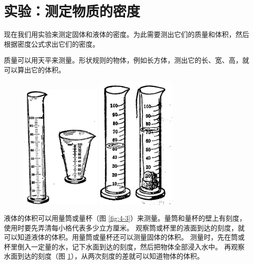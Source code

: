 \section{实验：测定物质的密度}\label{sec:4-2}

现在我们用实验来测定固体和液体的密度。为此需要测出它们的质量和体积，然后根据密度公式求出它们的密度。

质量可以用天平来测量。形状规则的物体，例如长方体，测出它的长、宽、高，就可以算出它的体积。


\begin{figure}[htbp]
    \centering
    \begin{minipage}{7cm}
    \centering
    \includegraphics[width=4cm]{../pic/czwl1-ch4-3}
    \caption{}\label{fig:4-3}
    \end{minipage}
    \qquad
    \begin{minipage}{7cm}
    \centering
    \includegraphics[width=4cm]{../pic/czwl1-ch4-4}
    \caption{}\label{fig:4-4}
    \end{minipage}
\end{figure}

液体的体积可以用量筒或量杯（图 \ref{fig:4-3}）来测量。量筒和量杯的壁上有刻度，使用时要先弄清每小格代表多少立方厘米\footnotemark。
观察筒或杯里的液面到达的刻度，就可以知道液体的体积。用量筒或量杯还可以测量固体的体积。
测量时，先在筒或杯里倒入一定量的水，记下水面到达的刻度，然后把物体全部浸入水中。
再观察水面到达的刻度（图 \ref{fig:4-4}），从两次刻度的差就可以知道物体的体积。


